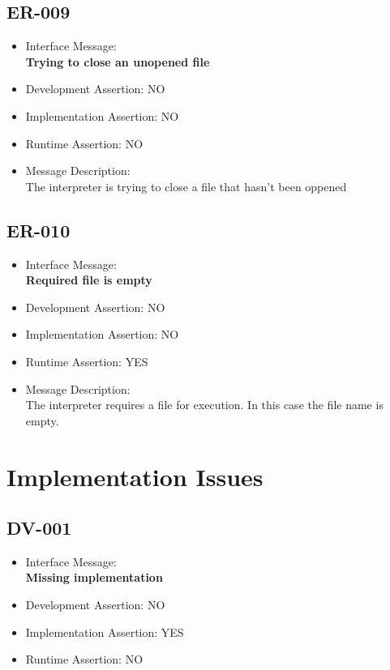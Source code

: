 \subsection{ER-009}
\begin{itemize}
  \item Interface Message:\\[1em]
    \textbf{Trying to close an unopened file}
  \item Development Assertion: NO
  \item Implementation Assertion: NO
  \item Runtime Assertion: NO
  \item Message Description:\\[1em]
    The interpreter is trying to close a file that hasn't been oppened
\end{itemize}

\subsection{ER-010}
\begin{itemize}
  \item Interface Message:\\[1em]
    \textbf{Required file is empty}
  \item Development Assertion: NO
  \item Implementation Assertion: NO
  \item Runtime Assertion: YES
  \item Message Description:\\[1em]
    The interpreter requires a file for execution. In this case the file name is empty.
\end{itemize}

\section{Implementation Issues}

\subsection{DV-001}
\begin{itemize}
  \item Interface Message:\\[1em]
    \textbf{Missing implementation}
  \item Development Assertion: NO
  \item Implementation Assertion: YES
  \item Runtime Assertion: NO
\end{itemize}

